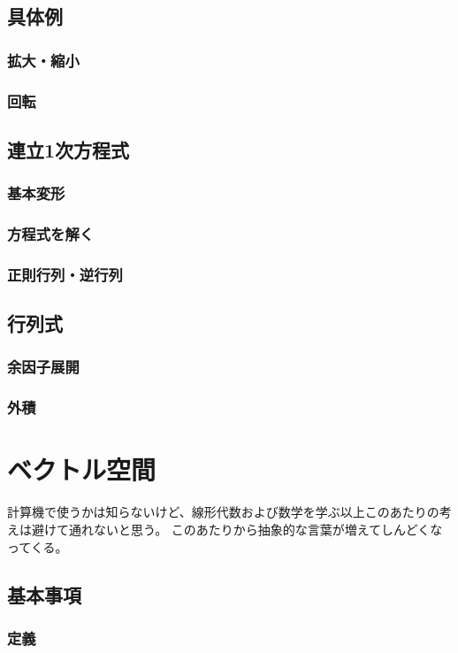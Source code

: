 \documentclass[10pt]{jsarticle}
\theoremstyle{definition}%
\numberwithin{equation}{section}%
\begin{document}
\subsection{具体例}

\subsubsection{拡大・縮小}

\subsubsection{回転}
\subsection{連立1次方程式}

\subsubsection{基本変形}
\subsubsection{方程式を解く}
\subsubsection{正則行列・逆行列}
\subsection{行列式}
\subsubsection{余因子展開}
\subsubsection{外積}

\section{ベクトル空間}
計算機で使うかは知らないけど、線形代数および数学を学ぶ以上このあたりの考えは避けて通れないと思う。
このあたりから抽象的な言葉が増えてしんどくなってくる。
\subsection{基本事項}
\subsubsection{定義}
\end{document}
